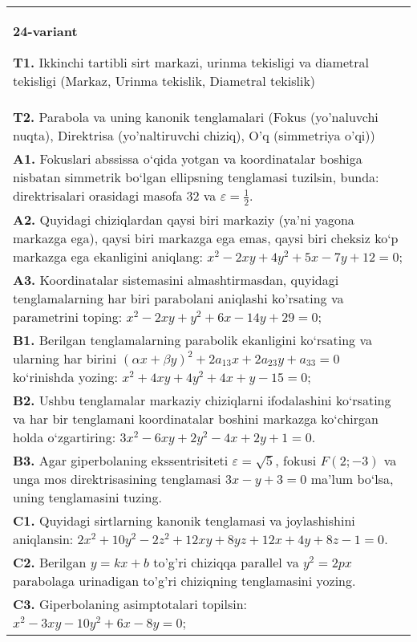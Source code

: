 \documentclass{article}
\begin{document}
\begin{tabular}{m{17cm}}
\textbf{24-variant}
\newline

\textbf{T1.} Ikkinchi tartibli sirt markazi, urinma tekisligi va diametral tekisligi (Markaz, Urinma tekislik, Diametral tekislik) \\
\textbf{T2.} Parabola va uning kanonik tenglamalari (Fokus (yo’naluvchi nuqta), Direktrisa (yo’naltiruvchi chiziq), O’q (simmetriya o’qi)) \\
\textbf{A1.} Fokuslari abssissa o‘qida yotgan va koordinatalar boshiga nisbatan simmetrik bo‘lgan ellipsning tenglamasi tuzilsin, bunda: direktrisalari orasidagi masofa 32 va $\varepsilon=\frac{1}{2}$. \\
\textbf{A2.} Quyidagi chiziqlardan qaysi biri markaziy (ya’ni yagona markazga ega), qaysi biri markazga ega emas, qaysi biri cheksiz ko‘p markazga ega ekanligini aniqlang: $x^2-2 x y+4 y^2+5 x-7 y+12=0$; \\
\textbf{A3.} Koordinatalar sistemasini almashtirmasdan, quyidagi tenglamalarning har biri parabolani aniqlashi ko'rsating va parametrini toping: $x^2-2 x y+y^2+6 x-14 y+29=0$; \\
\textbf{B1.} Berilgan tenglamalarning parabolik ekanligini ko‘rsating va ularning har birini $(\alpha x+\beta y)^2+2 a_{13} x+2 a_{23} y+a_{33}=0$ ko‘rinishda yozing: $x^2+4 x y+4 y^2+4 x+y-15=0 ;$ \\
\textbf{B2.} Ushbu tenglamalar markaziy chiziqlarni ifodalashini ko‘rsating va har bir tenglamani koordinatalar boshini markazga ko‘chirgan holda o‘zgartiring: $3x^2-6xy+2y^2-4x+2y+1=0$. \\
\textbf{B3.} Agar giperbolaning ekssentrisiteti $\varepsilon=\sqrt{5}$, fokusi $F (2;-3) $ va unga mos direktrisasining tenglamasi $3 x-y+3=0$ ma’lum bo‘lsa, uning tenglamasini tuzing. \\
\textbf{C1.} Quyidagi sirtlarning kanonik tenglamasi va joylashishini aniqlansin: $2 x^2+10 y^2-2 z^2+12 x y+8 y z+12 x+4 y+8 z-1=0$. \\
\textbf{C2.} Berilgan $y=k x+b$ to'g'ri chiziqqa parallel va $y^2=2 p x$ parabolaga urinadigan to'g'ri chiziqning tenglamasini yozing. \\
\textbf{C3.} Giperbolaning asimptotalari topilsin: $x^2-3 x y-10 y^2+6 x-8 y=0$; \\

\end{tabular}
\vspace{1cm}
\end{document}
